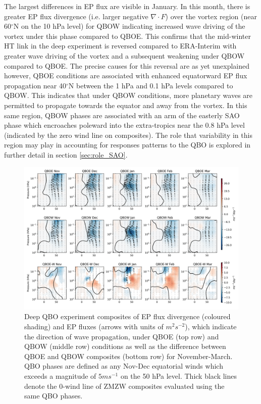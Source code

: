 The largest differences in EP flux are visible in January. In this month,
there is greater EP flux divergence (i.e. larger negative $\nabla \cdot F$) over the vortex region (near 60$^\circ$N on the 10 hPa level) for QBOW indicating increased wave driving of the vortex under this phase compared to QBOE. This confirms that the mid-winter HT link in the deep experiment is reversed compared to ERA-Interim with greater wave driving of the vortex and a subsequent weakening under QBOW compared to QBOE. The precise causes for this reversal are as yet unexplained however, QBOE conditions are associated with enhanced equatorward EP flux propagation near 40$^\circ$N between the 1 hPa and 0.1 hPa levels compared to QBOW. This indicates that under QBOW conditions, more planetary waves are permitted to propagate towards the equator and away from the vortex. In this same region, QBOW phases are associated with an arm of the easterly SAO phase which encroaches poleward into the extra-tropics near the 0.8 hPa level (indicated by the zero wind line on composites). The role that variability in this region may play in accounting for responses patterns to the QBO is explored in further detail in section \ref{sec:role_SAO}.

\newpage
\begin{figure}[h!]
\begin{center}
\noindent\includegraphics[width = \linewidth]{Figures/Figures-deepQBO/EP_flux_composites_by_month_QBO_phases_d_higher_50hPa_5thresh.png}
\caption[EP flux composites under QBO phases in the deep QBO simulation]{Deep QBO experiment composites of EP flux divergence (coloured shading) and EP fluxes (arrows with units of $m^2s^{-2}$), which indicate the direction of wave propagation, under QBOE (top row) and QBOW (middle row) conditions as well as the difference between QBOE and QBOW composites (bottom row) for November-March. QBO phases are defined as any Nov-Dec equatorial winds which exceeds a magnitude of $5ms^{-1}$ on the 50 hPa level. Thick black lines denote the 0-wind line of ZMZW composites evaluated using the same QBO phases.}
\label{fig:EP_deep}
\end{center}
\end{figure}

